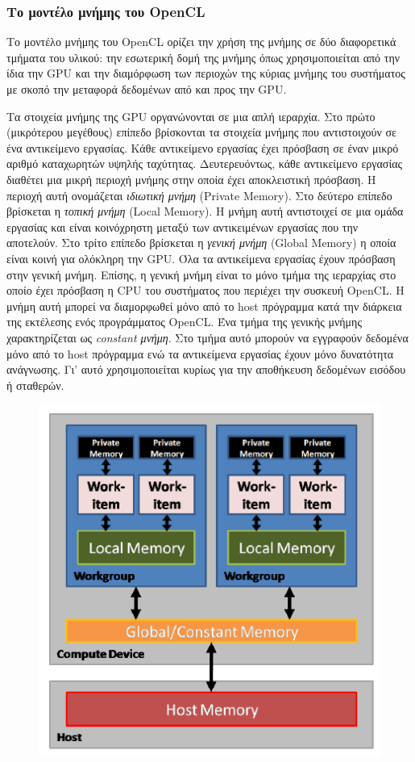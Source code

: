 \subsubsection*{Tο μοντέλο μνήμης του OpenCL}

\noindent Το μοντέλο μνήμης του OpenCL ορίζει την χρήση της μνήμης σε δύο διαφορετικά τμήματα του υλικού: την εσωτερική δομή της μνήμης όπως χρησιμοποιείται από την ίδια την GPU και την διαμόρφωση των περιοχών της κύριας μνήμης του συστήματος με σκοπό την μεταφορά δεδομένων από και προς την GPU.

Τα στοιχεία μνήμης της GPU οργανώνονται σε μια απλή ιεραρχία. Στο πρώτο (μικρότερου μεγέθους) επίπεδο βρίσκονται τα στοιχεία μνήμης που αντιστοιχούν σε ένα αντικείμενο εργασίας. Κάθε αντικείμενο εργασίας έχει πρόσβαση σε έναν μικρό αριθμό καταχωρητών υψηλής ταχύτητας. Δευτερευόντως, κάθε αντικείμενο εργασίας διαθέτει μια μικρή περιοχή μνήμης στην οποία έχει αποκλειστική πρόσβαση. Η περιοχή αυτή ονομάζεται \textit{ιδιωτική μνήμη} (Private Memory). Στο δεύτερο επίπεδο βρίσκεται η \textit{τοπική μνήμη} (Local Memory). Η μνήμη αυτή αντιστοιχεί σε μια ομάδα εργασίας και είναι κοινόχρηστη μεταξύ των αντικειμένων εργασίας που την αποτελούν. Στο τρίτο επίπεδο βρίσκεται η \textit{γενική μνήμη} (Global Memory) η οποία είναι κοινή για ολόκληρη την GPU. Όλα τα αντικείμενα εργασίας έχουν πρόσβαση στην γενική μνήμη. Επίσης, η γενική μνήμη είναι το μόνο τμήμα της ιεραρχίας στο οποίο έχει πρόσβαση η CPU του συστήματος που περιέχει την συσκευή OpenCL. Η μνήμη αυτή μπορεί να διαμορφωθεί μόνο από το host πρόγραμμα κατά την 
διάρκεια της εκτέλεσης ενός προγράμματος OpenCL. Ένα τμήμα της γενικής μνήμης χαρακτηρίζεται ως \textit{constant μνήμη}. Στο τμήμα αυτό μπορούν να εγγραφούν δεδομένα μόνο από το host πρόγραμμα ενώ τα αντικείμενα εργασίας έχουν μόνο δυνατότητα ανάγνωσης. Γι' αυτό χρησιμοποιείται κυρίως για την αποθήκευση δεδομένων εισόδου ή σταθερών. 

\begin{figure}[b!]
\includegraphics[scale=1]{./graphics/memorymodel.png}
\label{fig7}
\end{figure}

